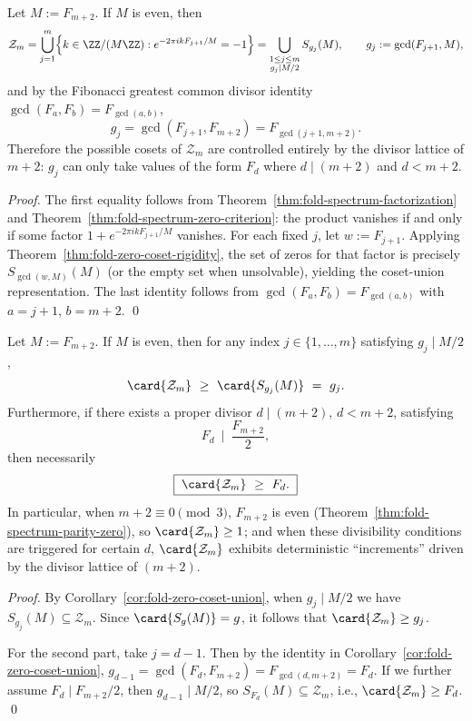 \begin{corollary}\label{cor:fold-zero-coset-union}
Let \(M:=F_{m+2}\). If \(M\) is even, then
\[
\mathcal{Z}_m=\bigcup_{j=1}^{m}\Bigl\{k\in\ZZ/(M\ZZ):e^{-2\pi i kF_{j+1}/M}=-1\Bigr\}
=\bigcup_{\substack{1\le j\le m\\ g_j\mid M/2}} S_{g_j}(M),
\qquad g_j:=\gcd(F_{j+1},M),
\]
and by the Fibonacci greatest common divisor identity \(\gcd(F_a,F_b)=F_{\gcd(a,b)}\),
\[
g_j=\gcd(F_{j+1},F_{m+2})=F_{\gcd(j+1,m+2)}.
\]
Therefore the possible cosets of \(\mathcal{Z}_m\) are controlled entirely by the divisor lattice of \(m+2\): \(g_j\) can only take values of the form \(F_d\) where \(d\mid(m+2)\) and \(d<m+2\).
\end{corollary}

\begin{proof}
The first equality follows from Theorem~\ref{thm:fold-spectrum-factorization} and Theorem~\ref{thm:fold-spectrum-zero-criterion}: the product vanishes if and only if some factor \(1+e^{-2\pi i kF_{j+1}/M}\) vanishes.
For each fixed \(j\), let \(w:=F_{j+1}\). Applying Theorem~\ref{thm:fold-zero-coset-rigidity}, the set of zeros for that factor is precisely \(S_{\gcd(w,M)}(M)\) (or the empty set when unsolvable), yielding the coset-union representation.
The last identity follows from \(\gcd(F_a,F_b)=F_{\gcd(a,b)}\) with \(a=j+1\), \(b=m+2\). \qed
\end{proof}

\begin{corollary}\label{cor:fold-zero-divisor-lb}
Let \(M:=F_{m+2}\). If \(M\) is even, then for any index \(j\in\{1,\dots,m\}\) satisfying \(g_j\mid M/2\),
\[
\card{\mathcal{Z}_m}\ \ge\ \card{S_{g_j}(M)}\ =\ g_j.
\]
Furthermore, if there exists a proper divisor \(d\mid(m+2)\), \(d<m+2\), satisfying
\[
F_d\ \mid\ \frac{F_{m+2}}{2},
\]
then necessarily
\[
\boxed{\;\card{\mathcal{Z}_m}\ \ge\ F_d.\;}
\]
In particular, when \(m+2\equiv 0\pmod 3\), \(F_{m+2}\) is even (Theorem~\ref{thm:fold-spectrum-parity-zero}), so \(\card{\mathcal{Z}_m}\ge 1\); and when these divisibility conditions are triggered for certain \(d\), \(\card{\mathcal{Z}_m}\) exhibits deterministic ``increments'' driven by the divisor lattice of \((m+2)\).
\end{corollary}
\begin{proof}
By Corollary~\ref{cor:fold-zero-coset-union}, when \(g_j\mid M/2\) we have \(S_{g_j}(M)\subseteq \mathcal{Z}_m\). Since \(\card{S_g(M)}=g\), it follows that \(\card{\mathcal{Z}_m}\ge g_j\).
\par
For the second part, take \(j=d-1\). Then by the identity in Corollary~\ref{cor:fold-zero-coset-union},
\(
g_{d-1}=\gcd(F_d,F_{m+2})=F_{\gcd(d,m+2)}=F_d
\).
If we further assume \(F_d\mid F_{m+2}/2\), then \(g_{d-1}\mid M/2\), so \(S_{F_d}(M)\subseteq \mathcal{Z}_m\), i.e., \(\card{\mathcal{Z}_m}\ge F_d\). \qed
\end{proof}


